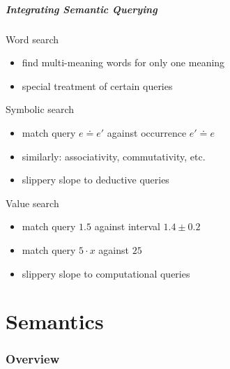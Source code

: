 \begin{frame}\frametitle{Integrating Semantic Querying}
Word search
\begin{itemize}
\item find multi-meaning words for only one meaning 
\item special treatment of certain queries 
\end{itemize}

Symbolic search
\begin{itemize}
\item match query $e\doteq e'$ against occurrence $e'\doteq e$
\item similarly: associativity, commutativity, etc.
\item slippery slope to deductive queries
\end{itemize}

Value search
\begin{itemize}
\item match query $1.5$ against interval $1.4\pm 0.2$
\item match query $5\cdot x$ against $25$
\item slippery slope to computational queries
\end{itemize}
\end{frame}

\part{Semantics}

\section{Overview}

